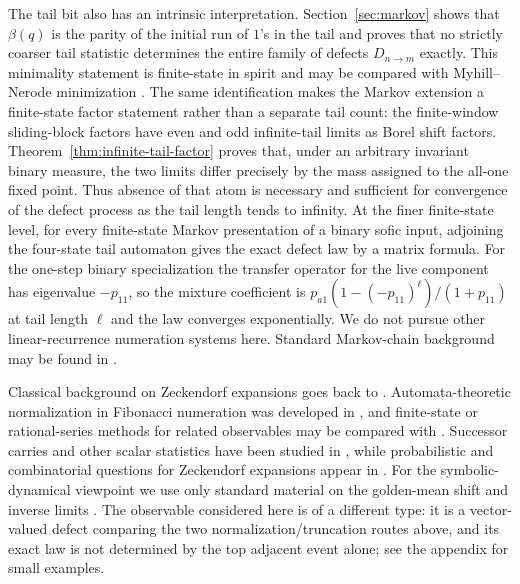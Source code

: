 The tail bit also has an intrinsic interpretation.  Section~\ref{sec:markov}
shows that $\beta(q)$ is the parity of the initial run of $1$'s in the tail
and proves that no strictly coarser tail statistic determines the entire
family of defects $D_{n\to m}$ exactly.  This minimality statement is
finite-state in spirit and may be compared with Myhill--Nerode minimization
\cite{Myhill1957,Nerode1958}.  The same identification makes the Markov
extension a finite-state factor statement rather than a separate tail count:
the finite-window sliding-block factors have even and odd infinite-tail
limits as Borel shift factors.  Theorem~\ref{thm:infinite-tail-factor} proves
that, under an arbitrary invariant binary measure, the two limits differ
precisely by the mass assigned to the all-one fixed point.  Thus absence of
that atom is necessary and sufficient for convergence of the defect process
as the tail length tends to infinity.  At the finer finite-state level,
for every finite-state Markov presentation of a binary sofic input, adjoining
the four-state tail automaton gives the exact defect law by a matrix formula.
For the one-step binary specialization the transfer operator for the live
component has eigenvalue $-p_{11}$, so the mixture coefficient is
$p_{a1}(1-(-p_{11})^\ell)/(1+p_{11})$ at tail length $\ell$ and the law
converges exponentially.  We do not pursue other linear-recurrence numeration
systems here.  Standard Markov-chain background may be found in
\cite{Parry1964,Norris1997,LevinPeresWilmer2009MarkovMixing}.

Classical background on Zeckendorf expansions goes back to
\cite{Lekkerkerker1952,Zeckendorf1972,Carlitz1968,CarlitzScovHoggatt1972,%
Fraenkel1985}.  Automata-theoretic normalization in Fibonacci numeration was
developed in
\cite{Frougny1991,Frougny1992,FrougnySolomyak1996,FrougnySakarovitch1999,%
Frougny1999,FrougnyS2010,ShallitShan2024}, and finite-state or rational-series
methods for related observables may be compared with
\cite{BerstelReutenauer2011}.  Successor carries and other scalar statistics
have been studied in
\cite{Frougny1996Successor,Frougny1997Sequential,AhlbachUsatineFrougnyPippenger2013,%
BertheFrougnyRigoSakarovitch2020}, while probabilistic and combinatorial
questions for Zeckendorf expansions appear in
\cite{KologluKoppMillerWang2011,DrmotaSteiner2002,Steiner2005,MillerWang2012,%
Griffiths2010,Hosten2024,BaratGrabner2014}.  For the symbolic-dynamical
viewpoint we use only standard material on the golden-mean shift and inverse
limits \cite{LindMarcus1995,Kitchens1998}.  The observable considered here is
of a different type: it is a vector-valued defect comparing the two
normalization/truncation routes above, and its exact law is not determined by
the top adjacent event alone; see the appendix for small examples.

